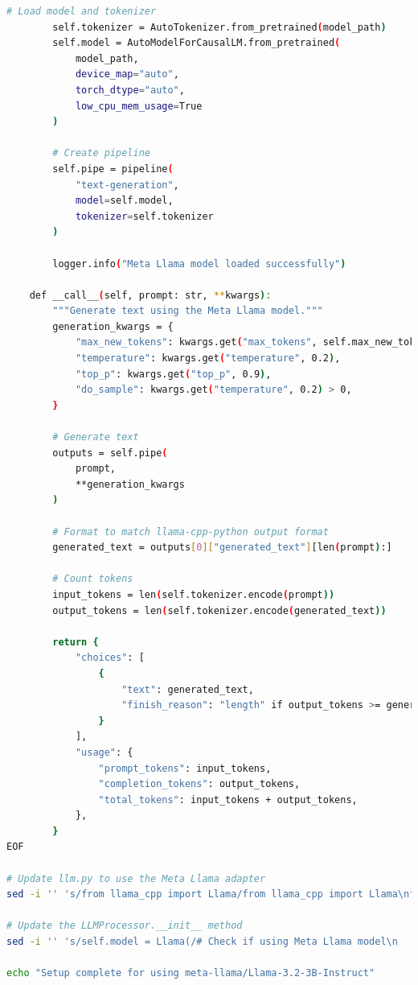 \documentclass[
  screen,review,acmlarge]{acmart}
\begin{document}
\begin{lstlisting}[language=bash]
        # Load model and tokenizer
        self.tokenizer = AutoTokenizer.from_pretrained(model_path)
        self.model = AutoModelForCausalLM.from_pretrained(
            model_path, 
            device_map="auto",
            torch_dtype="auto",
            low_cpu_mem_usage=True
        )
        
        # Create pipeline
        self.pipe = pipeline(
            "text-generation",
            model=self.model,
            tokenizer=self.tokenizer
        )
        
        logger.info("Meta Llama model loaded successfully")
    
    def __call__(self, prompt: str, **kwargs):
        """Generate text using the Meta Llama model."""
        generation_kwargs = {
            "max_new_tokens": kwargs.get("max_tokens", self.max_new_tokens),
            "temperature": kwargs.get("temperature", 0.2),
            "top_p": kwargs.get("top_p", 0.9),
            "do_sample": kwargs.get("temperature", 0.2) > 0,
        }
        
        # Generate text
        outputs = self.pipe(
            prompt,
            **generation_kwargs
        )
        
        # Format to match llama-cpp-python output format
        generated_text = outputs[0]["generated_text"][len(prompt):]
        
        # Count tokens
        input_tokens = len(self.tokenizer.encode(prompt))
        output_tokens = len(self.tokenizer.encode(generated_text))
        
        return {
            "choices": [
                {
                    "text": generated_text,
                    "finish_reason": "length" if output_tokens >= generation_kwargs["max_new_tokens"] else "stop",
                }
            ],
            "usage": {
                "prompt_tokens": input_tokens,
                "completion_tokens": output_tokens,
                "total_tokens": input_tokens + output_tokens,
            },
        }
EOF

# Update llm.py to use the Meta Llama adapter
sed -i '' 's/from llama_cpp import Llama/from llama_cpp import Llama\nfrom app.utils.adapters.meta_llama_adapter import MetaLlamaAdapter/' app/utils/llm.py

# Update the LLMProcessor.__init__ method
sed -i '' 's/self.model = Llama(/# Check if using Meta Llama model\n        if "Llama-3" in model_path and os.path.isdir(model_path):\n            self.model = MetaLlamaAdapter(\n                model_path=model_path,\n                max_new_tokens=max_tokens\n            )\n        else:\n            # Use llama-cpp for GGUF models\n            self.model = Llama(/' app/utils/llm.py

echo "Setup complete for using meta-llama/Llama-3.2-3B-Instruct"
\end{lstlisting}
\end{document}
